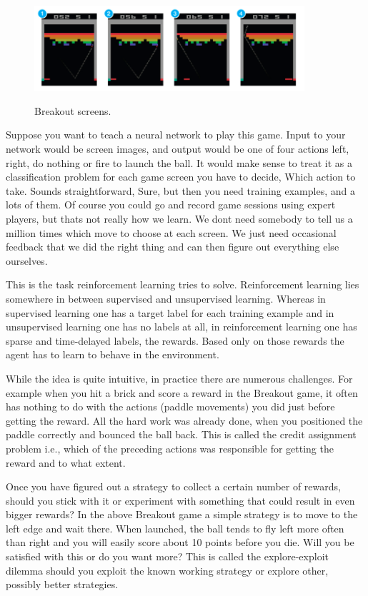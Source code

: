 \documentclass[a4paper,11pt]{article}
\begin{document}
				\begin{figure}[!ht]
					\begin{centering}
						\includegraphics[width=10cm]{../Design/images/breakout.png}\\
						\caption{Breakout screens.}
					\end{centering}
				\end{figure}
				Suppose you want to teach a neural network to play this game. Input to your network would be screen images, and output would be one of four actions left, right, do nothing or fire to launch the ball. It would make sense to treat it as a classification problem for each game screen you have to decide, Which action to take. Sounds straightforward, Sure, but then you need training examples, and a lots of them. Of course you could go and record game sessions using expert players, but thats not really how we learn. We dont need somebody to tell us a million times which move to choose at each screen. We just need occasional feedback that we did the right thing and can then figure out everything else ourselves.

				This is the task reinforcement learning tries to solve. Reinforcement learning lies somewhere in between supervised and unsupervised learning. Whereas in supervised learning one has a target label for each training example and in unsupervised learning one has no labels at all, in reinforcement learning one has sparse and time-delayed labels, the rewards. Based only on those rewards the agent has to learn to behave in the environment.

				While the idea is quite intuitive, in practice there are numerous challenges. For example when you hit a brick and score a reward in the Breakout game, it often has nothing to do with the actions (paddle movements) you did just before getting the reward. All the hard work was already done, when you positioned the paddle correctly and bounced the ball back. This is called the credit assignment problem i.e., which of the preceding actions was responsible for getting the reward and to what extent.

				Once you have figured out a strategy to collect a certain number of rewards, should you stick with it or experiment with something that could result in even bigger rewards? In the above Breakout game a simple strategy is to move to the left edge and wait there. When launched, the ball tends to fly left more often than right and you will easily score about 10 points before you die. Will you be satisfied with this or do you want more? This is called the explore-exploit dilemma should you exploit the known working strategy or explore other, possibly better strategies.
\end{document}

